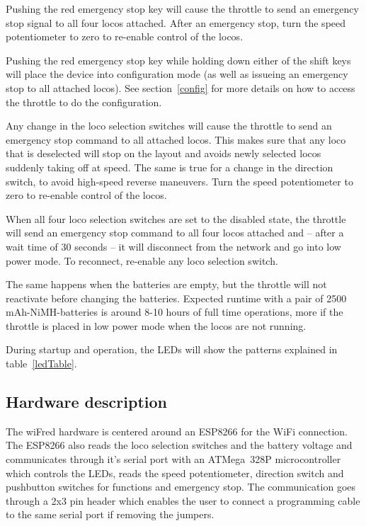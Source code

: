 \documentclass[11pt,a4paper]{scrartcl}
\begin{document}
Pushing the red emergency stop key will cause the throttle to send an emergency stop signal to all four locos attached. After an emergency stop, turn the speed potentiometer to zero to re-enable control of the locos.

Pushing the red emergency stop key while holding down either of the shift keys will place the device into configuration mode (as well as issueing an emergency stop to all attached locos). See section~\ref{config} for more details on how to access the throttle to do the configuration.

Any change in the loco selection switches will cause the throttle to send an emergency stop command to all attached locos. This makes sure that any loco that is deselected will stop on the layout and avoids newly selected locos suddenly taking off at speed. The same is true for a change in the direction switch, to avoid high-speed reverse maneuvers. Turn the speed potentiometer to zero to re-enable control of the locos.

When all four loco selection switches are set to the disabled state, the throttle will send an emergency stop command to all four locos attached and -- after a wait time of 30 seconds -- it will disconnect from the network and go into low power mode. To reconnect, re-enable any loco selection switch.

The same happens when the batteries are empty, but the throttle will not reactivate before changing the batteries. Expected runtime with a pair of 2500\,mAh-NiMH-batteries is around 8-10 hours of full time operations, more if the throttle is placed in low power mode when the locos are not running.

During startup and operation, the LEDs will show the patterns explained in table~\ref{ledTable}.

\subsection{Hardware description}

The wiFred hardware is centered around an ESP8266 for the WiFi connection. The ESP8266 also reads the loco selection switches and the battery voltage and communicates through it's serial port with an ATMega~328P microcontroller which controls the LEDs, reads the speed potentiometer, direction switch and pushbutton switches for functions and emergency stop. The communication goes through a 2x3 pin header which enables the user to connect a programming cable to the same serial port if removing the jumpers.
\end{document}
